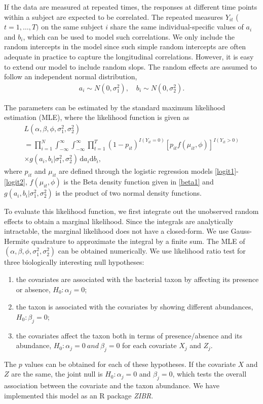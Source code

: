 If the data are measured at repeated times, the responses at different time points within a subject are expected to be correlated. The repeated measures $Y_{it}$ ($t=1,\ldots,T)$ on the same subject $i$ share the same individual-specific values of $a_i$ and $b_i$, which can be used to model such correlations.  We only include the random intercepts in the model since such  simple random intercepts are often adequate in practice \citep{min2005random} to capture the longitudinal correlations.  However, it is easy to extend our model to include   random slops. The random effects are assumed to follow an independent normal distribution, 
\begin{align*}
a_{i}  \sim N(0,\sigma_1^2), \quad 
b_{i} \sim N(0,\sigma_2^2).
\end{align*}


The parameters can be estimated by the standard maximum likelihood estimation (MLE), where  the likelihood function  is given as 
\begin{multline*}
L (\alpha,\beta, \phi, \sigma_1^2, \sigma_2^2)\\
= \prod_{i=1}^{N}\int_{-\infty}^{\infty}\int_{-\infty}^{\infty}  \prod_{t=1}^{T}(1- p_{it})^{I(Y_{it}=0)}[p_{it} f(\mu_{it},\phi)]^{I(Y_{it}>0)} \\
\times  g(a_i,b_i | \sigma_1^2,\sigma_2^2)\, \mathrm{d}a_i\mathrm{d}b_i,
\end{multline*}
where $p_{it}$ and $\mu_{it}$ are defined through the logistic regression models \eqref{logit1}-\eqref{logit2},  $f(\mu_{it},\phi)$ is the Beta density function given in \eqref{beta1} and $g(a_i,b_i | \sigma_1^2,\sigma_2^2)$  is  the product of two normal density functions. 

To evaluate this likelihood function, we first integrate out the unobserved random effects to obtain a marginal likelihood. Since the integrals are analytically intractable, the marginal likelihood does not have a closed-form. We use Gauss-Hermite quadrature to approximate the integral by a finite sum. The MLE of   $(\alpha, \beta, \phi, \sigma_1^2, \sigma_2^2)$ can be obtained numerically.
We use likelihood ratio test  for three  biologically interesting  null hypotheses:
\begin{enumerate}
\item  the covariates are associated  with the bacterial taxon  by affecting its presence or absence, 
$H_0: \alpha_j = 0$; 
\item the taxon  is associated with the covariates by showing different abundances, $H_0:\beta_j = 0$;
\item  the covariates affect the taxon   both in terms of presence/absence and its abundance, $H_0:\alpha_j=0~ and~ \beta_j=0$ for each covariate $X_j$ and $Z_j$.
\end{enumerate}
The $p$ values can be obtained for each of these hypotheses. If the covariate $X$ and $Z$ are the same,  the joint  null is $H_0:\alpha_j=0$ and $\beta_j=0$, which tests the overall association between the covariate and the taxon abundance.  We have implemented this model as an  R package {\it ZIBR}. 



